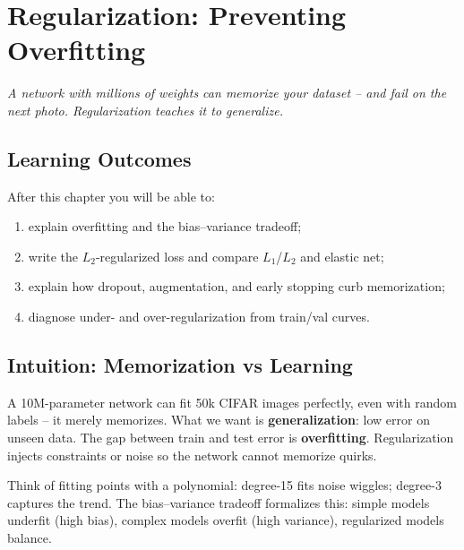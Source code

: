 \chapter{Regularization: Preventing Overfitting}\label{ch:regularization}
\begin{center}\small\textit{A network with millions of weights can memorize your dataset -- and fail on the next photo. Regularization teaches it to generalize.}\end{center}

\noindent{}
\vspace{0.3em}
\section*{Learning Outcomes}
After this chapter you will be able to:
\begin{enumerate}[label=(L\arabic*)]
    \item explain overfitting and the bias--variance tradeoff;
    \item write the $L_2$-regularized loss and compare $L_1$/$L_2$ and elastic net;
    \item explain how dropout, augmentation, and early stopping curb memorization;
    \item diagnose under- and over-regularization from train/val curves.
\end{enumerate}

\section{Intuition: Memorization vs Learning}
A 10M-parameter network can fit 50k CIFAR images perfectly, even with random labels -- it merely memorizes. What we want is \textbf{generalization}: low error on unseen data. The gap between train and test error is \textbf{overfitting}. Regularization injects constraints or noise so the network cannot memorize quirks.

Think of fitting points with a polynomial: degree-15 fits noise wiggles; degree-3 captures the trend. The bias--variance tradeoff formalizes this: simple models underfit (high bias), complex models overfit (high variance), regularized models balance.


